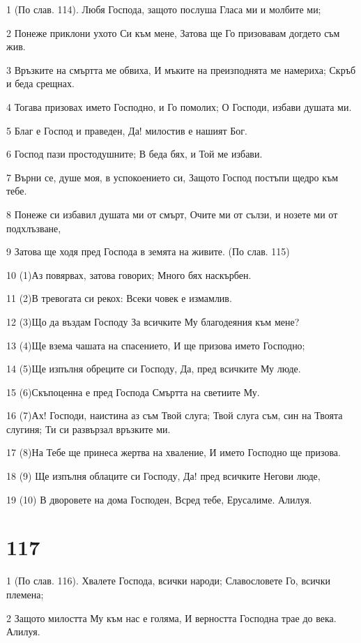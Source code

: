 \par 1 (По слав. 114). Любя Господа, защото послуша Гласа ми и молбите ми;
\par 2 Понеже приклони ухото Си към мене, Затова ще Го призовавам догдето съм жив.
\par 3 Връзките на смъртта ме обвиха, И мъките на преизподнята ме намериха; Скръб и беда срещнах.
\par 4 Тогава призовах името Господно, и Го помолих; О Господи, избави душата ми.
\par 5 Благ е Господ и праведен, Да! милостив е нашият Бог.
\par 6 Господ пази простодушните; В беда бях, и Той ме избави.
\par 7 Върни се, душе моя, в успокоението си, Защото Господ постъпи щедро към тебе.
\par 8 Понеже си избавил душата ми от смърт, Очите ми от сълзи, и нозете ми от подхлъзване,
\par 9 Затова ще ходя пред Господа в земята на живите. (По слав. 115)
\par 10 (1)Аз повярвах, затова говорих; Много бях наскърбен.
\par 11 (2)В тревогата си рекох: Всеки човек е измамлив.
\par 12 (3)Що да въздам Господу За всичките Му благодеяния към мене?
\par 13 (4)Ще взема чашата на спасението, И ще призова името Господно;
\par 14 (5)Ще изпълня обреците си Господу, Да, пред всичките Му люде.
\par 15 (6)Скъпоценна е пред Господа Смъртта на светиите Му.
\par 16 (7)Ах! Господи, наистина аз съм Твой слуга; Твой слуга съм, син на Твоята слугиня; Ти си развързал връзките ми.
\par 17 (8)На Тебе ще принеса жертва на хваление, И името Господно ще призова.
\par 18 (9) Ще изпълня облаците си Господу, Да! пред всичките Негови люде,
\par 19 (10) В дворовете на дома Господен, Всред тебе, Ерусалиме. Алилуя.

\chapter{117}

\par 1 (По слав. 116). Хвалете Господа, всички народи; Славословете Го, всички племена;
\par 2 Защото милостта Му към нас е голяма, И верността Господна трае до века. Алилуя.

